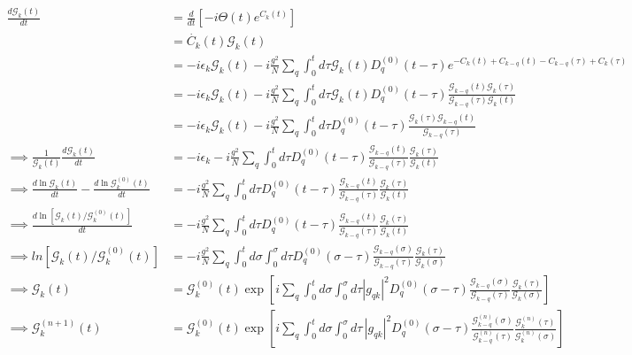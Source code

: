 \begin{align}
\frac{d \mathcal{G}_k(t)}{d t}&= \frac{d}{d t}\left[-i \Theta(t) e^{C_k(t)}\right] \\
&= \dot{C_k}(t) \mathcal{G}_k(t) \\
&= -i \epsilon_k \mathcal{G}_k(t) - i \frac{g^2}{N} \sum_q \int_0^t d \tau \mathcal{G}_k(t) D_q^{(0)}(t-\tau) e^{-C_k(t)+C_{k-q}(t)-C_{k-q}(\tau)+C_k(\tau)} \\
&= -i \epsilon_k \mathcal{G}_k(t) - i \frac{g^2}{N} \sum_q \int_0^t d \tau \mathcal{G}_k(t) D_q^{(0)}(t-\tau) \frac{\mathcal{G}_{k-q}(t) \mathcal{G}_k(\tau)}{\mathcal{G}_{k-q}(\tau) \mathcal{G}_k(t)} \\
&=-i \epsilon_k \mathcal{G}_k(t) - i \frac{g^2}{N} \sum_q \int_0^t d \tau D_q^{(0)}(t-\tau) \frac{\mathcal{G}_k(\tau) \mathcal{G}_{k-q}(t)}{\mathcal{G}_{k-q}(\tau)}\label{a9}\\
\implies \frac{1}{\mathcal{G}_k(t)} \frac{d \mathcal{G}_k(t)}{d t}&={-i \epsilon_k} - i \frac{g^2}{N} \sum_q \int_0^t d \tau D_q^{(0)}(t-\tau) \frac{\mathcal{G}_{k-q}(t)}{\mathcal{G}_{k-q}(\tau)} \frac{\mathcal{G}_k(\tau)}{\mathcal{G}_k(t)} \label{a8} \\
\implies \frac{d \ln \mathcal{G}_k(t)}{d t}-\frac{d \ln \mathcal{G}_k^{(0)}(t)}{d t}&=- i \frac{g^2}{N} \sum_q \int_0^t d \tau D_q^{(0)}(t-\tau) \frac{\mathcal{G}_{k-q}(t)}{\mathcal{G}_{k-q}(\tau)} \frac{\mathcal{G}_k(\tau)}{\mathcal{G}_k(t)} \\
\implies \frac{d \ln \left[\mathcal{G}_k(t) / \mathcal{G}_k^{(0)}(t)\right]}{d t}&=- i \frac{g^2}{N} \sum_q \int_0^t d \tau D_q^{(0)}(t-\tau) \frac{\mathcal{G}_{k-q}(t)}{\mathcal{G}_{k-q}(\tau)} \frac{\mathcal{G}_k(\tau)}{\mathcal{G}_k(t)} \\
\implies ln \left[\mathcal{G}_k(t) / \mathcal{G}_k^{(0)}(t)\right] &=- i \frac{g^2}{N} \sum_q \int_0^t d \sigma \int_0^\sigma d \tau D_q^{(0)}(\sigma-\tau) \frac{\mathcal{G}_{k-q}(\sigma)}{\mathcal{G}_{k-q}(\tau)} \frac{\mathcal{G}_k(\tau)}{\mathcal{G}_k(\sigma)} \\
\implies \mathcal{G}_k(t) &=\mathcal{G}_k^{(0)}(t) \exp \left[i \sum_q \int_0^t d \sigma \int_0^\sigma d \tau\left|g_{q k}\right|^2 D_q^{(0)}(\sigma-\tau) \frac{\mathcal{G}_{k-q}(\sigma)}{\mathcal{G}_{k-q}(\tau)} \frac{\mathcal{G}_k(\tau)}{\mathcal{G}_k(\sigma)}\right] \\
\implies \mathcal{G}_k^{(n+1)}(t)
&=\mathcal{G}_k^{(0)}(t)
\exp\!\left[
i\!\sum_q
\int_0^t d\sigma\!\!\int_0^\sigma d\tau\,
\left|g_{q k}\right|^2 D_q^{(0)}(\sigma\!-\!\tau)
\frac{\mathcal{G}_{k-q}^{(n)}(\sigma)}{\mathcal{G}_{k-q}^{(n)}(\tau)}
\frac{\mathcal{G}_k^{(n)}(\tau)}{\mathcal{G}_k^{(n)}(\sigma)}
\right]
\end{align}
